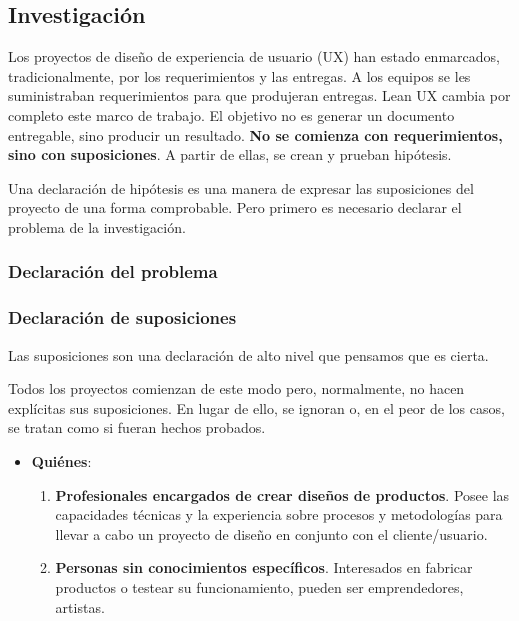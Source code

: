 \subsection{Investigación}

Los proyectos de diseño de experiencia de usuario (UX) han estado enmarcados, tradicionalmente, por los requerimientos y las entregas. A los equipos se les suministraban requerimientos para que produjeran entregas. Lean UX cambia por completo este marco de trabajo. El objetivo no es generar un documento entregable, sino producir un resultado. \textbf{No se comienza con requerimientos, sino con suposiciones}. A partir de ellas, se crean y prueban hipótesis. 

Una declaración de hipótesis es una manera de expresar las suposiciones del proyecto de una forma comprobable. Pero primero es necesario declarar el problema de la investigación.

\subsubsection{Declaración del problema}



\subsubsection{Declaración de suposiciones}
Las suposiciones son una declaración de alto nivel que pensamos que es cierta.

Todos los proyectos comienzan de este modo pero, normalmente, no hacen explícitas sus suposiciones. En lugar de ello, se ignoran o, en el peor de los casos, se tratan como si fueran hechos probados.

\begin{itemize}
 

\item \textbf{Quiénes}:
\begin{enumerate}
\item \textbf{Profesionales encargados de crear diseños de productos}. Posee las capacidades técnicas y la experiencia sobre procesos y metodologías para llevar a cabo un proyecto de diseño en conjunto con el cliente/usuario.
\item \textbf{Personas sin conocimientos específicos}. Interesados en fabricar productos o testear su funcionamiento, pueden ser emprendedores, artistas.
\end{enumerate}

\end{itemize}


